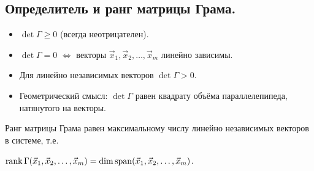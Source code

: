 \subsection{
    Определитель и ранг матрицы Грама.
}


\begin{itemize}
    \item $\det \Gamma \geq 0$ (всегда неотрицателен).
    \item $\det \Gamma = 0$ $\iff$ векторы $\vec{x}_1, \vec{x}_2, \dots, \vec{x}_m$ линейно зависимы.
    \item Для линейно независимых векторов $\det \Gamma > 0$.
    \item Геометрический смысл: $\det \Gamma$ равен квадрату объёма параллелепипеда, натянутого на векторы.
\end{itemize}

Ранг матрицы Грама равен максимальному числу линейно независимых векторов в системе, т.е. 

$\operatorname{\mathop{\mathrm{rank}}} \Gamma(\vec{x}_1, \vec{x}_2, \dots, \vec{x}_m) = \dim \operatorname{\mathop{\mathrm{span}}} (\vec{x}_1, \vec{x}_2, \dots, \vec{x}_m)$.
